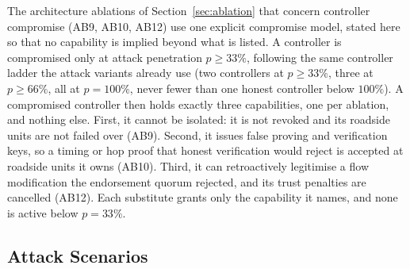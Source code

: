 \documentclass[final,5p,twocolumn]{elsarticle}
\theoremstyle{remark}
\theoremstyle{plain}
\begin{document}
The architecture ablations of Section~\ref{sec:ablation} that concern
controller compromise (AB9, AB10, AB12) use one explicit compromise model,
stated here so that no capability is implied beyond what is listed. A
controller is compromised only at attack penetration $p \ge 33\%$, following
the same controller ladder the attack variants already use (two controllers
at $p \ge 33\%$, three at $p \ge 66\%$, all at $p{=}100\%$, never fewer than
one honest controller below $100\%$). A compromised controller then holds
exactly three capabilities, one per ablation, and nothing else. First, it
cannot be isolated: it is not revoked and its roadside units are not failed
over (AB9). Second, it issues false proving and verification keys, so a
timing or hop proof that honest verification would reject is accepted at
roadside units it owns (AB10). Third, it can retroactively legitimise a flow
modification the endorsement quorum rejected, and its trust penalties are
cancelled (AB12). Each substitute grants only the capability it names, and
none is active below $p{=}33\%$.

\subsection{Attack Scenarios}
\label{sec:attack_scenarios}
\end{document}
